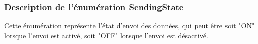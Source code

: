 \subsubsection{Description de l'énumération SendingState}

Cette énumération représente l'état d'envoi des données, qui peut être soit "ON" lorsque l'envoi est activé, soit "OFF" lorsque l'envoi est désactivé.
\newline
